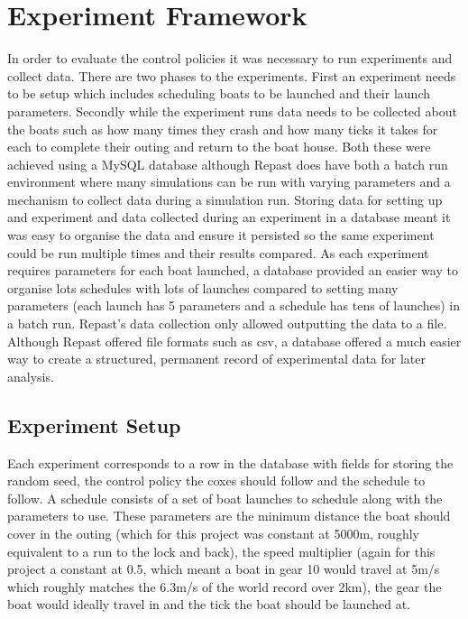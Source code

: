   
  
      
  \section{Experiment Framework}
  In order to evaluate the control policies it was necessary to run experiments and collect data. There are two phases to the experiments. First an experiment needs to be setup which includes scheduling boats to be launched and their launch parameters. Secondly while the experiment runs data needs to be collected about the boats such as how many times they crash and how many ticks it takes for each to complete their outing and return to the boat house. Both these were achieved using a MySQL database although Repast does have both a batch run environment where many simulations can be run with varying parameters and a mechanism to collect data during a simulation run. Storing data for setting up and experiment and data collected during an experiment in a database meant it was easy to organise the data and ensure it persisted so the same experiment could be run multiple times and their results compared. As each experiment requires parameters for each boat launched, a database provided an easier way to organise lots schedules with lots of launches compared to setting many parameters (each launch has 5 parameters and a schedule has tens of launches) in a batch run. Repast's data collection only allowed outputting the data to a file. Although Repast offered file formats such as csv, a database offered a much easier way to create a structured, permanent record of experimental data for later analysis.
  
  \subsection{Experiment Setup}
  Each experiment corresponds to a row in the database with fields for storing the random seed, the control policy the coxes should follow and the schedule to follow. A schedule consists of a set of boat launches to schedule along with the parameters to use. These parameters are the minimum distance the boat should cover in the outing (which for this project was constant at 5000m, roughly equivalent to a run to the lock and back), the speed multiplier (again for this project a constant at 0.5, which meant a boat in gear 10 would travel at 5m/s which roughly matches the 6.3m/s of the world record over 2km), the gear the boat would ideally travel in and the tick the boat should be launched at. 
  
